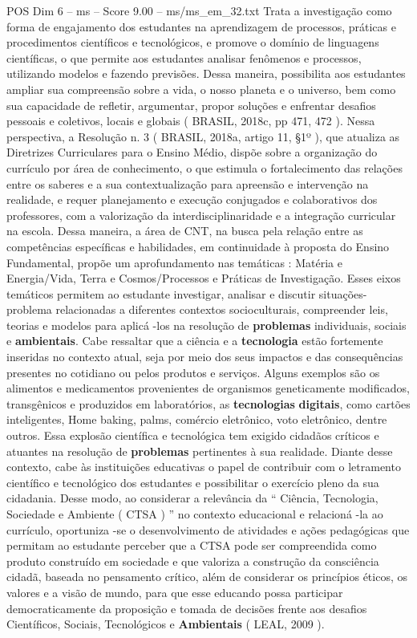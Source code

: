 \begin{textsample}{POS Dim 6 – ms – Score 9.00 – ms/ms\_em\_32.txt}
Trata a investigação como forma de engajamento dos estudantes na aprendizagem de processos, práticas e procedimentos científicos e tecnológicos, e promove o domínio de linguagens científicas, o que permite aos estudantes analisar fenômenos e processos, utilizando modelos e fazendo previsões.
Dessa maneira, possibilita aos estudantes ampliar sua compreensão sobre a vida, o nosso planeta e o universo, bem como sua capacidade de refletir, argumentar, propor soluções e enfrentar desafios pessoais e coletivos, locais e globais ( BRASIL, 2018c, pp 471, 472 ).
Nessa perspectiva, a Resolução n. 3 ( BRASIL, 2018a, artigo 11, §1º ), que atualiza as Diretrizes Curriculares para o Ensino Médio, dispõe sobre a organização do currículo por área de conhecimento, o que estimula o fortalecimento das relações entre os saberes e a sua contextualização para apreensão e intervenção na realidade, e requer planejamento e execução conjugados e colaborativos dos professores, com a valorização da interdisciplinaridade e a integração curricular na escola.
Dessa maneira, a área de CNT, na busca pela relação entre as competências específicas e habilidades, em continuidade à proposta do Ensino Fundamental, propõe um aprofundamento nas temáticas : Matéria e Energia/Vida, Terra e Cosmos/Processos e Práticas de Investigação.
Esses eixos temáticos permitem ao estudante investigar, analisar e discutir situações-problema relacionadas a diferentes contextos socioculturais, compreender leis, teorias e modelos para aplicá -los na resolução de \textbf{problemas} individuais, sociais e \textbf{ambientais}.
Cabe ressaltar que a ciência e a \textbf{tecnologia} estão fortemente inseridas no contexto atual, seja por meio dos seus impactos e das consequências presentes no cotidiano ou pelos produtos e serviços.
Alguns exemplos são os alimentos e medicamentos provenientes de organismos geneticamente modificados, transgênicos e produzidos em laboratórios, as \textbf{tecnologias} \textbf{digitais}, como cartões inteligentes, Home baking, palms, comércio eletrônico, voto eletrônico, dentre outros.
Essa explosão científica e tecnológica tem exigido cidadãos críticos e atuantes na resolução de \textbf{problemas} pertinentes à sua realidade.
Diante desse contexto, cabe às instituições educativas o papel de contribuir com o letramento científico e tecnológico dos estudantes e possibilitar o exercício pleno da sua cidadania.
Desse modo, ao considerar a relevância da “ Ciência, Tecnologia, Sociedade e Ambiente ( CTSA ) ” no contexto educacional e relacioná -la ao currículo, oportuniza -se o desenvolvimento de atividades e ações pedagógicas que permitam ao estudante perceber que a CTSA pode ser compreendida como produto construído em sociedade e que valoriza a construção da consciência cidadã, baseada no pensamento crítico, além de considerar os princípios éticos, os valores e a visão de mundo, para que esse educando possa participar democraticamente da proposição e tomada de decisões frente aos desafios Científicos, Sociais, Tecnológicos e \textbf{Ambientais} ( LEAL, 2009 ).

\end{textsample}
